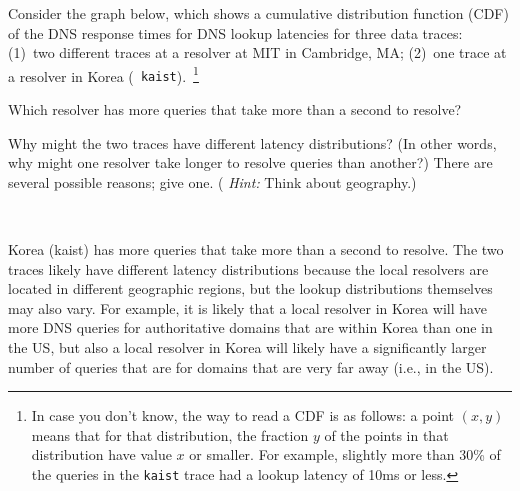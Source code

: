 \documentclass[11pt]{article}
\newcounter{partctr}
\newcommand{\ansbelow}{\probnote{Answer legibly in the space below.}}
\newcommand{\sols}[1]{#1}
\newcommand{\sols}[1]{}
\begin{document}
 Consider the graph below, which shows a cumulative distribution
function (CDF) of the DNS response times for DNS lookup latencies for
three data traces: (1)~two different traces at a resolver at MIT in
Cambridge, MA; (2)~one trace at a resolver in Korea ({\tt
  kaist}).~\footnote{In case you don't know, the way to read a CDF is as
  follows: a point $(x,y)$ means that for that distribution, the
  fraction $y$ of the points in that distribution have value $x$ or
  smaller.  For example, slightly more than 30\% of the queries in the
  {\tt kaist} trace had a lookup latency of 10ms or less.}
\setcounter{partctr}{0}
\begin{list}{\bf{}.}{}
\item Which resolver has more queries that take more than a second to
  resolve? 
\item Why might the two traces have different latency distributions?
  (In other words, why might one resolver take longer to resolve queries
  than another?)  There are several possible reasons; give one.  ({\em
    Hint:} Think about geography.)
\end{list}
~\ansbelow 
\begin{center}
\end{center}
\vspace{2in}
\eprob

\sols{
\vspace{-1in}
\begin{answer}
Korea (kaist) has more queries that take more than a second to resolve.
The two traces likely have different latency distributions because the
local resolvers are located in different geographic regions, but the
lookup distributions themselves may also vary.  For example, it is
likely that a local resolver in Korea will have more DNS queries for
authoritative domains that are within Korea than one in the US, but also
a local resolver in Korea will likely have a significantly larger number
of queries that are for domains that are very far away (i.e., in the US).
\end{answer}
}
\end{document}
